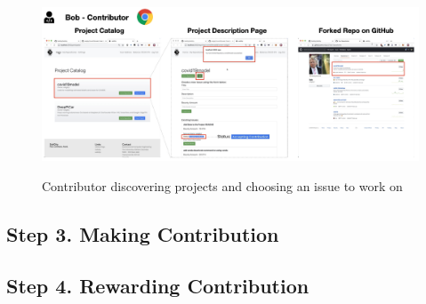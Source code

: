 \documentclass[12pt]{article}
\renewcommand{\_}{\kern-1.5pt\textunderscore\kern-1.5pt}
\begin{document}
     \begin{figure}[H]
    	\centering
        \includegraphics[width=16.5cm]{graphs/52. discover_1.png}\\
    	\caption{Contributor discovering projects and choosing an issue to work on}
    	\label{fig:discover1}
    \end{figure}


\subsection*{Step 3. Making Contribution}
\subsection*{Step 4. Rewarding Contribution}

















\end{document}
